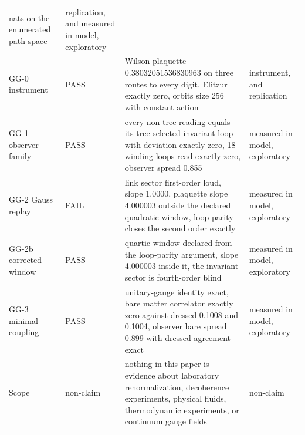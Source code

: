 \documentclass[aps,pre,reprint,nofootinbib,floatfix]{revtex4-2}
\begin{document}
\begin{table}[t]
\begin{ruledtabular}
\begin{tabular}{L{1.7cm}lL{10.6cm}L{2.7cm}}
nats on the enumerated path space & replication, and measured in
model, exploratory \\
GG-0 instrument & PASS & Wilson plaquette 0.38032051536830963 on
three routes to every digit, Elitzur exactly zero, orbits size 256
with constant action & instrument, and replication \\
GG-1 observer family & PASS & every non-tree reading equals its
tree-selected invariant loop with deviation exactly zero, 18
winding loops read exactly zero, observer spread 0.855 & measured
in model, exploratory \\
GG-2 Gauss replay & FAIL & link sector first-order loud, slope
1.0000, plaquette slope 4.000003 outside the declared quadratic
window, loop parity closes the second order exactly & measured in
model, exploratory \\
GG-2b corrected window & PASS & quartic window declared from the
loop-parity argument, slope 4.000003 inside it, the invariant
sector is fourth-order blind & measured in model, exploratory \\
GG-3 minimal coupling & PASS & unitary-gauge identity exact, bare
matter correlator exactly zero against dressed 0.1008 and 0.1004,
observer bare spread 0.899 with dressed agreement exact & measured
in model, exploratory \\
Scope & non-claim & nothing in this paper is evidence about
laboratory renormalization, decoherence experiments, physical
fluids, thermodynamic experiments, or continuum gauge fields &
non-claim \\
\end{tabular}
\end{ruledtabular}
\end{table}
\end{document}
